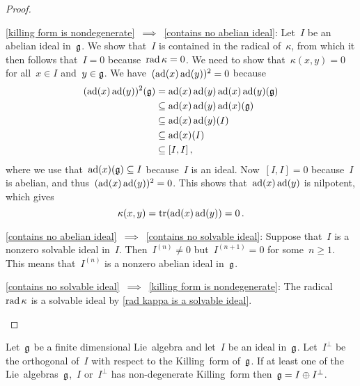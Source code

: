 \begin{proof}
  \leavevmode
  \begin{implicationlist}
    \item[\ref*{killing form is nondegenerate}~$\implies$~\ref*{contains no abelian ideal}:]
      Let~$I$ be an abelian ideal in~$\mathfrak{g}$.
      We show that~$I$ is contained in the radical of~$\kappa$, from which it then follows that~$I = 0$ because~$\operatorname{rad} \kappa = 0$.
      We need to show that~$\kappa(x,y) = 0$ for all~$x \in I$ and~$y \in \mathfrak{g}$.
      We have~$(\operatorname{ad}(x) \operatorname{ad}(y))^2 = 0$ because
      \begin{align*}
        (\operatorname{ad}(x) \operatorname{ad}(y))^2(\mathfrak{g})
        &=
        \operatorname{ad}(x)\operatorname{ad}(y)\operatorname{ad}(x)\operatorname{ad}(y)(\mathfrak{g})
        \\
        &\subseteq
        \operatorname{ad}(x)\operatorname{ad}(y)\operatorname{ad}(x)(\mathfrak{g})
        \\
        &\subseteq
        \operatorname{ad}(x)\operatorname{ad}(y)(I)
        \\
        &\subseteq
        \operatorname{ad}(x)(I)
        \\
        &\subseteq
        [I,I] \,,
      \end{align*}
      where we use that~$\operatorname{ad}(x)(\mathfrak{g}) \subseteq I$ because~$I$ is an ideal.
      Now~$[I,I] = 0$ because~$I$ is abelian, and thus~$(\operatorname{ad}(x)\operatorname{ad}(y))^2 = 0$.
      This shows that~$\operatorname{ad}(x)\operatorname{ad}(y)$ is nilpotent, which gives
      \[
        \kappa(x,y)
        =
        \operatorname{tr}(\operatorname{ad}(x) \operatorname{ad}(y))
        =
        0 \,.
      \]
    \item[\ref*{contains no abelian ideal}~$\implies$~\ref*{contains no solvable ideal}:]
      Suppose that~$I$ is a nonzero solvable ideal in~$I$.
      Then~$I^{(n)} \neq 0$ but~$I^{(n+1)} = 0$ for some~$n \geq 1$.
      This means that~$I^{(n)}$ is a nonzero abelian ideal in~$\mathfrak{g}$.
    \item[\ref*{contains no solvable ideal}~$\implies$~\ref*{killing form is nondegenerate}:]
      The radical~$\operatorname{rad} \kappa$ is a solvable ideal by \cref{rad kappa is a solvable ideal}.
    \qedhere
  \end{implicationlist}
\end{proof}


\begin{corollary}
  \label{decomposition into orthogonals for semisimple}
  Let~$\mathfrak{g}$ be a finite dimensional Lie~algebra and let~$I$ be an ideal in~$\mathfrak{g}$.
  Let~$I^\perp$ be the orthogonal of~$I$ with respect to the Killing~form of~$\mathfrak{g}$.
  If at least one of the Lie~algebras~$\mathfrak{g}$,~$I$ or~$I^\perp$ has non-degenerate Killing~form then~$\mathfrak{g} = I \oplus I^\perp$.
\end{corollary}


